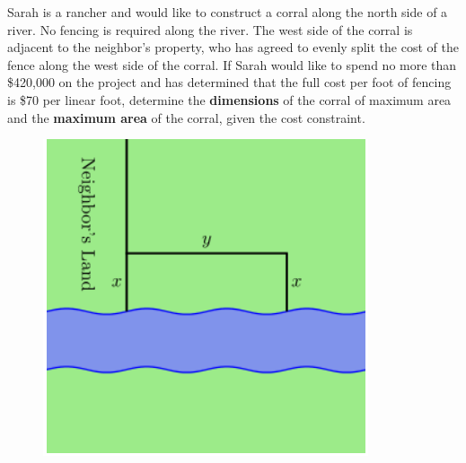 \begin{multicols}{2}
	\begin{minipage}{0.65\textwidth}
	
\noindent Sarah is a rancher and would like to construct a corral along the north side of a river. No fencing is required along the river. The west side of the corral is adjacent to the neighbor's property, who has agreed to evenly split the cost of the fence along the west side of the corral. If Sarah would like to spend no more than \$420,000 on the project and has determined that the full cost per foot of fencing is \$70 per linear foot, determine the \textbf{dimensions} of the corral of maximum area and the \textbf{maximum area} of the corral, given the cost constraint. 	 \\
\end{minipage}

\begin{minipage}{0.55\textwidth}
	\vspace{-0.75cm}
		\begin{figure}[H]
		\flushright
		\includegraphics[scale=1.5]{images/optimization/Optimization_fencing2.PNG}
		\label{fig:fencing1}
	\end{figure}
\end{minipage}
\end{multicols}

